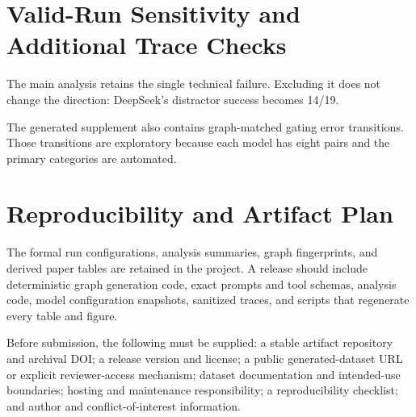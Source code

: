 \documentclass[twoside,11pt,preprint]{article}
\begin{document}




\appendix
\section{Valid-Run Sensitivity and Additional Trace Checks}

The main analysis retains the single technical failure. Excluding it does not
change the direction: DeepSeek's distractor success becomes 14/19.



The generated supplement also contains graph-matched gating error transitions.
Those transitions are exploratory because each model has eight pairs and the
primary categories are automated.

\section{Reproducibility and Artifact Plan}

The formal run configurations, analysis summaries, graph fingerprints, and
derived paper tables are retained in the project. A release should include
deterministic graph generation code, exact prompts and tool schemas, analysis
code, model configuration snapshots, sanitized traces, and scripts that
regenerate every table and figure.

Before submission, the following must be supplied: a stable artifact repository
and archival DOI; a release version and license; a public generated-dataset URL
or explicit reviewer-access mechanism; dataset documentation and intended-use
boundaries; hosting and maintenance responsibility; a reproducibility
checklist; and author and conflict-of-interest information.
\end{document}
